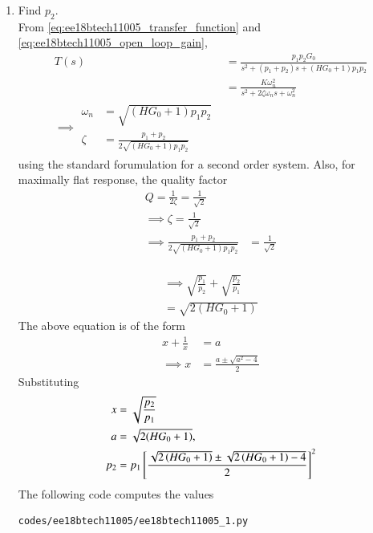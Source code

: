 \begin{enumerate}[label=\arabic*.,ref=\theenumi]
\item Find $p_2$.
\\
\solution From \eqref{eq:ee18btech11005_transfer_function} and \eqref{eq:ee18btech11005_open_loop_gain},
\begin{align}
    T(s) &= \frac{p_1p_2G_0}{s^2+(p_1+p_2)s+(HG_0+1)p_1p_2} \label{eq:ee18btech11005_closed_loop}
\\
&= \frac{K \omega_n^{2}}{s^2+2\zeta\omega_ns+\omega_n^{2}}
\\
\implies 
\begin{split}
    \omega_n &= \sqrt{(HG_0+1)p_1p_2}\\
    \zeta &= \frac{p_1+p_2}{2\sqrt{(HG_0+1)p_1p_2}}
\end{split}
\label{eq:ee18btech11005_second_order_zeta}
\end{align}
using the standard forumulation for a second order system.  Also, for maximally flat response, the quality factor 
\begin{align}
    Q = \frac{1}{2\zeta}= \frac{1}{\sqrt{2}}&
\\
\implies  \zeta = \frac{1}{\sqrt{2}} &
\label{eq:ee18btech11005_second_order_zeta_q}
\\
\implies \frac{p_1+p_2}{2\sqrt{(HG_0+1)p_1p_2}} &= \frac{1}{\sqrt{2}}
\end{align}
\\
\begin{multline}
\implies \sqrt{\frac{p_1}{p_2}}+\sqrt{\frac{p_2}{p_1}} 
\\
= \sqrt{2(HG_0+1)} 
\end{multline}
%
The above equation is of the form 
%
\begin{align}
x + \frac{1}{x} &= a
\\
\implies x &= \frac{a \pm \sqrt{a^2 -4}}{2}
\end{align}
%
Substituting 
%
\begin{align}
x  &= \sqrt{\frac{p_2}{p_1}}
\\
a &= \sqrt{2(HG_0+1)}, 
\\
p_2 &= p_1{}\left[\frac{\sqrt{2\left(HG_0+1\right)} \pm \sqrt{2 \left(HG_0+1\right)-4}}{2}\right]^2
\end{align}
%
The following code computes the values 
\begin{lstlisting}
codes/ee18btech11005/ee18btech11005_1.py
\end{lstlisting}


\end{enumerate}
